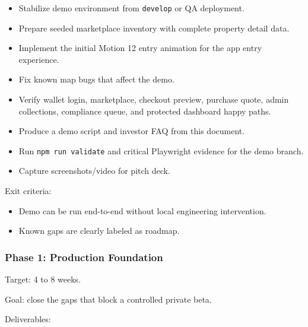\documentclass[
  10pt,
  letterpaper,
]{article}
\providecommand{\tightlist}{%
  \setlength{\itemsep}{0pt}\setlength{\parskip}{0pt}}
\let\oldtexttt\texttt
\renewcommand{\texttt}[1]{\oldtexttt{\small #1}}
\begin{document}
\begin{itemize}
\tightlist
\item
  Stabilize demo environment from \texttt{develop} or QA deployment.
\item
  Prepare seeded marketplace inventory with complete property detail
  data.
\item
  Implement the initial Motion 12 entry animation for the app entry
  experience.
\item
  Fix known map bugs that affect the demo.
\item
  Verify wallet login, marketplace, checkout preview, purchase quote,
  admin collections, compliance queue, and protected dashboard happy
  paths.
\item
  Produce a demo script and investor FAQ from this document.
\item
  Run \texttt{npm\ run\ validate} and critical Playwright evidence for
  the demo branch.
\item
  Capture screenshots/video for pitch deck.
\end{itemize}

Exit criteria:

\begin{itemize}
\tightlist
\item
  Demo can be run end-to-end without local engineering intervention.
\item
  Known gaps are clearly labeled as roadmap.
\end{itemize}

\subsubsection{Phase 1: Production
Foundation}\label{phase-1-production-foundation}

Target: 4 to 8 weeks.

Goal: close the gaps that block a controlled private beta.

Deliverables:
\end{document}
